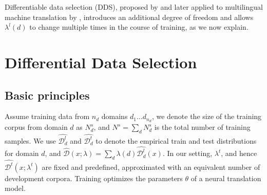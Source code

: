 \documentclass[11pt,a4paper]{article}
\begin{document}
Differentiable data selection (DDS), proposed by \citet{Wang20optimizing} and later applied to multilingual machine translation by \citet{Wang20balancing}, introduces an additional degree of freedom and allows $\lambda^{l}(d)$ to change multiple times in the course of training, as we now explain.


\section{Differential Data Selection} \label{sec:dds}
\subsection{Basic principles}
Assume training data from $n_d$ domains $d_1 \dots d_{n_d}$, we denote the size of the training corpus from domain $d$ as  $N^{s}_d$, and $N^{s} = \sum_d N^{s}_d$ is the total number of training samples. We use $\widehat{\mathcal{D}^l_d}$ and $\widehat{\mathcal{D}^t _d}$ to denote the empirical train and test distributions for domain $d$, and $\widehat{\mathcal{D}}(x;\lambda) = \sum_{d} \lambda(d) \widehat{\mathcal{D}^l_d}(x)$. In our setting,  $\lambda^t$, and hence $\widehat{\mathcal{D}^t}(x;\lambda^t)$ are fixed and predefined, approximated with an equivalent number of development corpora. Training optimizes the parameters $\theta$ of a neural translation model.
\end{document}
